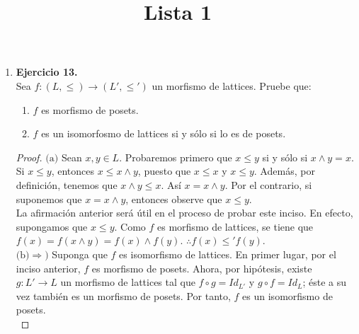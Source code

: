 \documentclass{article}
\title{Lista 1}
\author{}
\date{}
\newcommand{\lrprth}[1]{
    \left(#1\right)
}
\theoremstyle{definition}
\theoremstyle{plain}
\theoremstyle{plain}
\theoremstyle{definition}
\theoremstyle{definition}
\theoremstyle{definition}
\theoremstyle{definition}
\theoremstyle{definition}
\theoremstyle{definition}
\begin{document}
\maketitle

\begin{enumerate}[label=\textbf{Ej \arabic*.}]
	\item \textbf{Ejercicio 13.}\\
	Sea $f:\lrprth{L, \leq } \longrightarrow \lrprth{L', \leq '}$ un morfismo de lattices. Pruebe que:
	\begin{enumerate}
		\item $f$ es morfismo de posets.
		\item $f$ es un isomorfosmo de lattices si y sólo si lo es de posets.
	\end{enumerate}
	\begin{proof}
		$\boxed{\text{(a)}}$ Sean $x,y \in L$. Probaremos primero que $x \leq y$ si y sólo si $x \wedge y = x$. Si $x \leq y$, entonces $x \leq x \wedge y$, puesto que $x \leq x$ y $x \leq y$. Además, por definición, tenemos que $x \wedge y \leq x$. Así $x = x \wedge y$. Por el contrario, si suponemos que $x = x \wedge y$, entonces observe que $x \leq y$.\\
	
		La afirmación anterior será útil en el proceso de probar este inciso. En efecto, supongamos que $x \leq y$. Como $f$ es morfismo de lattices, se tiene que $f\lrprth{x}=f\lrprth{x \wedge y}=f\lrprth{x} \wedge f\lrprth{y}$. $\therefore f\lrprth{x} \leq ' f\lrprth{y}$.\\
	
		$\boxed{\text{(b)}} \boxed{\Rightarrow )}$ Suponga que $f$ es isomorfismo de lattices. En primer lugar, por el inciso anterior, $f$ es morfismo de posets. Ahora, por hipótesis, existe $g:L' \longrightarrow L$ un morfismo de lattices tal que $f \circ g = Id_{L'}$ y $g \circ f = Id_{L}$; éste a su vez también es un morfismo de posets. Por tanto, $f$ es un isomorfismo de posets.\\


\end{proof}
\end{enumerate}
\end{document}
